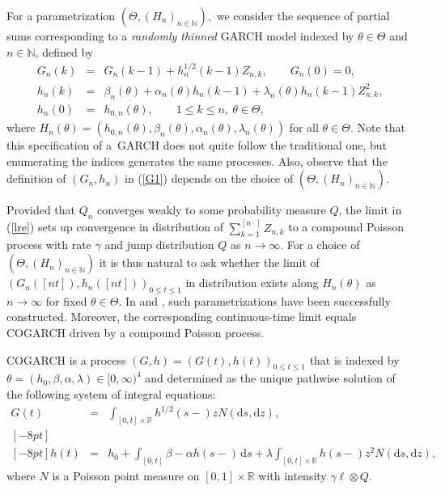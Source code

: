 \documentclass[number,citesort,seceqn,dvips]{arxbj}
\newcommand{\eqref}[1]{(\ref{#1})}
\newcommand{\RR}{\mathbb{R}}
\newcommand{\NN}{\mathbb{N}}
\begin{document}
For a parametrization $(\Theta,(H_n)_{n\in\NN}),$ we consider the
sequence of partial sums corresponding to a \textit{randomly thinned}
GARCH model indexed by $\theta\in\Theta$ and $n\in\NN$, defined by
%
\begin{eqnarray}\label{G1}
G_{n}(k)&=&G_{n}(k  -  1)+h^{1/2}_n(k  -  1)
Z_{n,k} ,\qquad  G_n(0) = 0 ,\nonumber\\
h_{n}(k)&=&\beta_n(\theta)+\alpha_n(\theta)
h_{n}(k  -  1)+
\lambda_n(\theta)  h_{n}(k  -  1) Z_{n,k}^2 ,\\
h_{n}(0)&=&h_{0,n}(\theta),\qquad 1\le k\le
n ,\ \theta\in\Theta,\nonumber
\end{eqnarray}
%
where
$H_n(\theta)=(h_{0,n}(\theta),\beta_n(\theta),\alpha_n(\theta
),\lambda_n(\theta))$
for all $\theta\in\Theta$. Note that this specification of a~GARCH does
not quite follow the traditional one, but enumerating the indices
generates the same processes. Also, observe that the definition of
$(G_n,h_n)$ in \eqref{G1} depends on the choice of
$(\Theta,(H_n)_{n\in\NN})$.

Provided that $Q_n$ converges weakly to some probability measure $Q$,
the limit in \eqref{lre} sets up convergence in distribution of
$\sum_{k=1}^{[n\cdot]} Z_{n,k}$ to a compound Poisson process with rate
$\gamma$ and jump distribution $Q$ as $n\to\infty$. For a choice of
$(\Theta,(H_n)_{n\in\NN})$ it is thus natural to ask whether the limit
of $(G_n([nt]),h_n([nt]))_{0\le t\le1}$ in distribution exists along
$H_n(\theta)$ as $n\to\infty$ for fixed $\theta\in\Theta$. In
\cite{KV07} and \cite{MMS08}, such parametrizations have been
successfully constructed. Moreover, the corresponding continuous-time
limit equals COGARCH driven by a compound Poisson process.

COGARCH is a process $(G,h)=(G(t),h(t))_{0\le t\le1}$ that is indexed
by $\theta=(h_0,\beta,\alpha,\lambda)\in[0,\infty)^4$ and
determined as
the unique pathwise solution of the following system of integral
equations:
%
\begin{eqnarray}\label{COG}
G(t)&=&\int_{[0,t]\times\RR} h^{1/2}(s-)z N(\mathrm{d}s,\mathrm{d}z) ,\nonumber\\ [-8pt]\\ [-8pt]
h(t)&=&h_0+ \int_{[0,t]} \beta - \alpha h(s-)\,\mathrm{d}s+\lambda
\int_{[0,t]\times\RR}  h(s-)z^2 N(\mathrm{d}s,\mathrm{d}z),\nonumber
\end{eqnarray}
%
where $N$ is a Poisson point measure on $[0,1]\times\RR$ with intensity
$\gamma\ell\otimes Q$.
\end{document}

